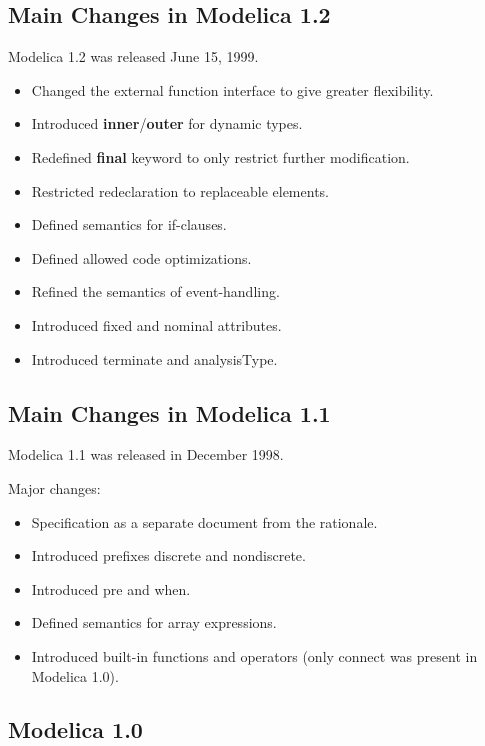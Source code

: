 \documentclass[10pt,a4paper]{report}
\def\doublelabel#1{\label{#1}\hypertarget{#1}{}}
\begin{document}
\subsection{Main Changes in Modelica 1.2}\doublelabel{main-changes-in-modelica-1-2}
Modelica 1.2 was released June 15, 1999.

\begin{itemize}
\item
  Changed the external function interface to give greater flexibility.
\item
  Introduced \textbf{inner}/\textbf{outer} for dynamic types.
\item
  Redefined \textbf{final} keyword to only restrict further
  modification.
\item
  Restricted redeclaration to replaceable elements.
\item
  Defined semantics for if-clauses.
\item
  Defined allowed code optimizations.
\item
  Refined the semantics of event-handling.
\item
  Introduced fixed and nominal attributes.
\item
  Introduced terminate and analysisType.
\end{itemize}

\subsection{Main Changes in Modelica 1.1}\doublelabel{main-changes-in-modelica-1-1}
Modelica 1.1 was released in December 1998.

Major changes:

\begin{itemize}
\item
  Specification as a separate document from the rationale.
\item
  Introduced prefixes discrete and nondiscrete.
\item
  Introduced pre and when.
\item
  Defined semantics for array expressions.
\item
  Introduced built-in functions and operators (only connect was present
  in Modelica 1.0).
\end{itemize}

\subsection{Modelica 1.0}\doublelabel{modelica-1-0}
\end{document}
